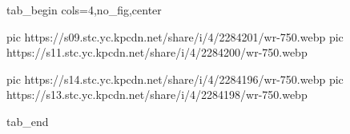  
 
 
 
 

\ifcmt
  tab_begin cols=4,no_fig,center

     pic https://s09.stc.yc.kpcdn.net/share/i/4/2284201/wr-750.webp
		 pic https://s11.stc.yc.kpcdn.net/share/i/4/2284200/wr-750.webp

     pic https://s14.stc.yc.kpcdn.net/share/i/4/2284196/wr-750.webp
		 pic https://s13.stc.yc.kpcdn.net/share/i/4/2284198/wr-750.webp

  tab_end
\fi
